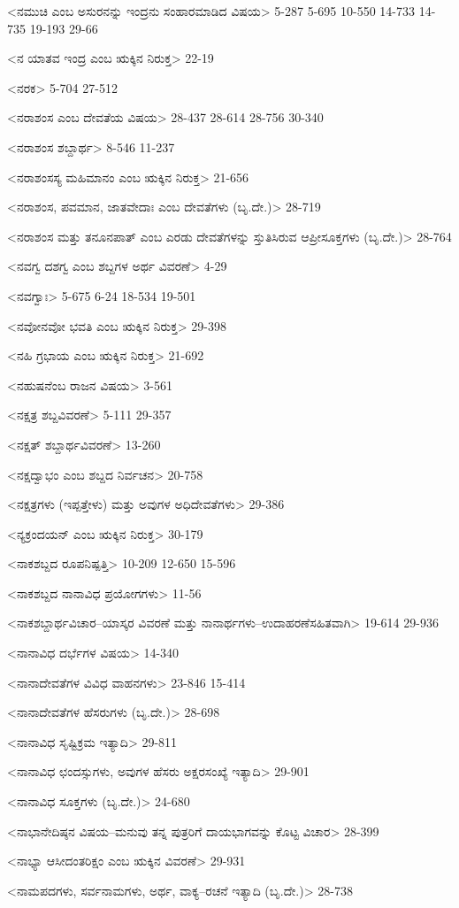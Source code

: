 <ನಮುಚಿ ಎಂಬ ಅಸುರನನ್ನು ಇಂದ್ರನು ಸಂಹಾರಮಾಡಿದ ವಿಷಯ>
5-287 
5-695 
10-550
14-733 
14-735 
19-193 
29-66

<ನ ಯಾತವ ಇಂದ್ರ ಎಂಬ ಋಕ್ಕಿನ ನಿರುಕ್ತ>
22-19

<ನರಕ>
5-704
27-512

<ನರಾಶಂಸ ಎಂಬ ದೇವತೆಯ ವಿಷಯ>
28-437
28-614
28-756
30-340

<ನರಾಶಂಸ ಶಬ್ದಾರ್ಥ>
8-546
11-237

<ನರಾಶಂಸಸ್ಯ ಮಹಿಮಾನಂ ಎಂಬ ಋಕ್ಕಿನ ನಿರುಕ್ತ>
21-656

<ನರಾಶಂಸ, ಪವಮಾನ, ಜಾತವೇದಾಃ ಎಂಬ ದೇವತೆಗಳು (ಬೃ.ದೇ.)>
28-719

<ನರಾಶಂಸ ಮತ್ತು ತನೂನಪಾತ್‍ ಎಂಬ ಎರಡು ದೇವತೆಗಳನ್ನು ಸ್ತುತಿಸಿರುವ ಆಪ್ರೀಸೂಕ್ತಗಳು (ಬೃ.ದೇ.)>
28-764

<ನವಗ್ವ ದಶಗ್ವ ಎಂಬ ಶಬ್ದಗಳ ಅರ್ಥ ವಿವರಣೆ>
4-29

<ನವಗ್ವಾಃ>
5-675 
6-24 
18-534 
19-501

<ನವೋನವೋ ಭವತಿ ಎಂಬ ಋಕ್ಕಿನ ನಿರುಕ್ತ>
29-398

<ನಹಿ ಗ್ರಭಾಯ ಎಂಬ ಋಕ್ಕಿನ ನಿರುಕ್ತ>
21-692

<ನಹುಷನೆಂಬ ರಾಜನ ವಿಷಯ>
3-561

<ನಕ್ಷತ್ರ ಶಬ್ದವಿವರಣೆ>
5-111 
29-357

<ನಕ್ಷತ್‍ ಶಬ್ದಾರ್ಥವಿವರಣೆ>
13-260

<ನಕ್ಷದ್ವಾಭಂ ಎಂಬ ಶಬ್ದದ ನಿರ್ವಚನ>
20-758

<ನಕ್ಷತ್ರಗಳು (ಇಪ್ಪತ್ತೇಳು) ಮತ್ತು ಅವುಗಳ ಅಧಿದೇವತೆಗಳು>
29-386

<ನ್ಯಕ್ರಂದಯನ್‍ ಎಂಬ ಋಕ್ಕಿನ ನಿರುಕ್ತ>
30-179

<ನಾಕಶಬ್ದದ ರೂಪನಿಷ್ಪತ್ತಿ>
10-209 
12-650 
15-596

<ನಾಕಶಬ್ದದ ನಾನಾವಿಧ ಪ್ರಯೋಗಗಳು>
11-56

<ನಾಕಶಬ್ದಾರ್ಥವಿಚಾರ–ಯಾಸ್ಕರ ವಿವರಣೆ ಮತ್ತು ನಾನಾರ್ಥಗಳು–ಉದಾಹರಣೆಸಹಿತವಾಗಿ>
19-614 
29-936

<ನಾನಾವಿಧ ದರ್ಭೆಗಳ ವಿಷಯ>
14-340

<ನಾನಾದೇವತೆಗಳ ವಿವಿಧ ವಾಹನಗಳು>
23-846 
15-414

<ನಾನಾದೇವತೆಗಳ ಹೆಸರುಗಳು (ಬೃ.ದೇ.)>
28-698

<ನಾನಾವಿಧ ಸೃಷ್ಟಿಕ್ರಮ ಇತ್ಯಾದಿ>
29-811

<ನಾನಾವಿಧ ಛಂದಸ್ಸುಗಳು, ಅವುಗಳ ಹೆಸರು ಅಕ್ಷರಸಂಖ್ಯೆ ಇತ್ಯಾದಿ>
29-901

<ನಾನಾವಿಧ ಸೂಕ್ತಗಳು (ಬೃ.ದೇ.)>
24-680

<ನಾಭಾನೇದಿಷ್ಠನ ವಿಷಯ–ಮನುವು ತನ್ನ ಪುತ್ರರಿಗೆ ದಾಯಭಾಗವನ್ನು ಕೊಟ್ಟ ವಿಚಾರ>
28-399

<ನಾಭ್ಯಾ ಆಸೀದಂತರಿಕ್ಷಂ ಎಂಬ ಋಕ್ಕಿನ ವಿವರಣೆ>
29-931

<ನಾಮಪದಗಳು, ಸರ್ವನಾಮಗಳು, ಅರ್ಥ, ವಾಕ್ಯ–ರಚನೆ ಇತ್ಯಾದಿ (ಬೃ.ದೇ.)>
28-738

